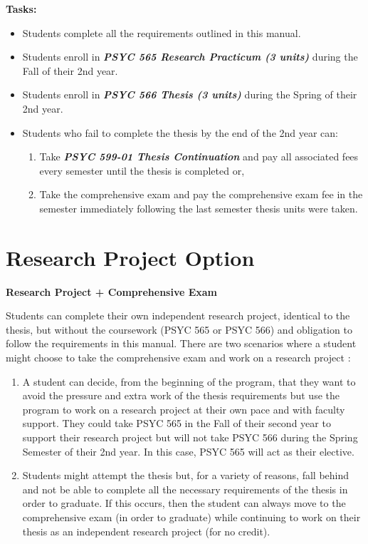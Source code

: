\documentclass[
  openany]{book}
\providecommand{\tightlist}{%
  \setlength{\itemsep}{0pt}\setlength{\parskip}{0pt}}
\begin{document}
\textbf{Tasks:}

\begin{itemize}
\tightlist
\item
  Students complete all the requirements outlined in this manual.
\item
  Students enroll in \textbf{\emph{PSYC 565 Research Practicum (3 units)}} during the Fall of their 2nd year.
\item
  Students enroll in \textbf{\emph{PSYC 566 Thesis (3 units)}} during the Spring of their 2nd year.
\item
  Students who fail to complete the thesis by the end of the 2nd year can:

  \begin{enumerate}
  \def\labelenumi{\arabic{enumi}.}
  \tightlist
  \item
    Take \textbf{\emph{PSYC 599-01 Thesis Continuation}} and pay all associated fees every semester until the thesis is completed or,
  \item
    Take the comprehensive exam and pay the comprehensive exam fee in the semester immediately following the last semester thesis units were taken.
  \end{enumerate}
\end{itemize}

\hypertarget{research-project-option}{%
\section{Research Project Option}\label{research-project-option}}

\textbf{Research Project + Comprehensive Exam}

Students can complete their own independent research project, identical to the thesis, but without the coursework (PSYC 565 or PSYC 566) and obligation to follow the requirements in this manual. There are two scenarios where a student might choose to take the comprehensive exam and work on a research project :

\begin{enumerate}
\def\labelenumi{\arabic{enumi}.}
\item
  A student can decide, from the beginning of the program, that they want to avoid the pressure and extra work of the thesis requirements but use the program to work on a research project at their own pace and with faculty support. They could take PSYC 565 in the Fall of their second year to support their research project but will not take PSYC 566 during the Spring Semester of their 2nd year. In this case, PSYC 565 will act as their elective.
\item
  Students might attempt the thesis but, for a variety of reasons, fall behind and not be able to complete all the necessary requirements of the thesis in order to graduate. If this occurs, then the student can always move to the comprehensive exam (in order to graduate) while continuing to work on their thesis as an independent research project (for no credit).
\end{enumerate}
\end{document}
